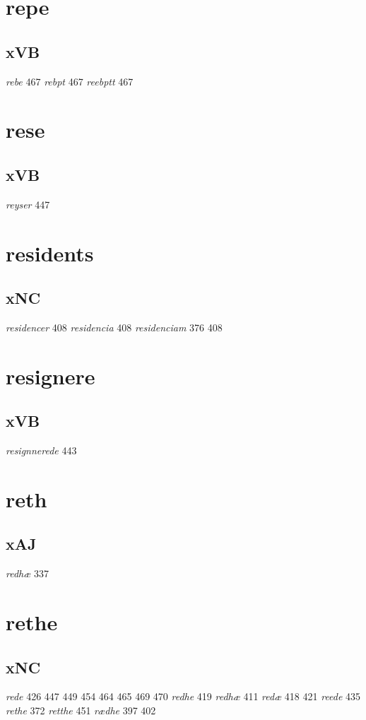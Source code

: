 \documentclass[a4paper,twocolumn]{article}
\begin{document}
\section{repe}
\label{sec:org5731f40}
\subsection{xVB}
\label{sec:org9709e14}
\emph{rebe} 467 \emph{rebpt} 467 \emph{reebptt} 467 
\section{rese}
\label{sec:orge2dcb77}
\subsection{xVB}
\label{sec:org156a799}
\emph{reyser} 447 
\section{residents}
\label{sec:org5a3c65e}
\subsection{xNC}
\label{sec:orgbd827ef}
\emph{residencer} 408 \emph{residencia} 408 \emph{residenciam} 376 408 
\section{resignere}
\label{sec:orgf84e7d9}
\subsection{xVB}
\label{sec:orgee72b7c}
\emph{resignnerede} 443 
\section{reth}
\label{sec:org43fc5c6}
\subsection{xAJ}
\label{sec:org25ee06b}
\emph{redhæ} 337 
\section{rethe}
\label{sec:org52c939f}
\subsection{xNC}
\label{sec:orgc2a79f0}
\emph{rede} 426 447 449 454 464 465 469 470 \emph{redhe} 419 \emph{redhæ} 411 \emph{redæ} 418 421 \emph{reede} 435 \emph{rethe} 372 \emph{retthe} 451 \emph{rædhe} 397 402 
\end{document}
